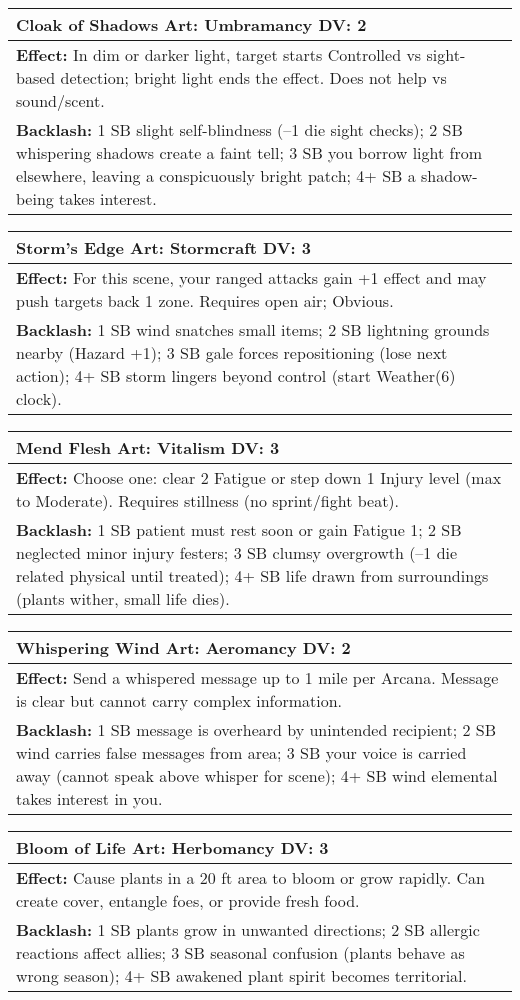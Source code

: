 \documentclass[11pt]{report}
\newenvironment{spellentry}[3]{%
  \begin{center}
    \begin{tabular}{|p{5.5in}|}
      \hline
      \textbf{#1} \hfill \textbf{Art:} #2 \hfill \textbf{DV:} #3 \\
      \hline
}{%
      \hline
    \end{tabular}
  \end{center}
}
\begin{document}
\begin{spellentry}{Cloak of Shadows}{Umbramancy}{2}
\textbf{Effect:} In dim or darker light, target starts Controlled vs sight-based detection; bright light ends the effect. Does not help vs sound/scent.\\
\textbf{Backlash:} 1 SB slight self-blindness (–1 die sight checks); 2 SB whispering shadows create a faint tell; 3 SB you borrow light from elsewhere, leaving a conspicuously bright patch; 4+ SB a shadow-being takes interest.
\end{spellentry}

\begin{spellentry}{Storm's Edge}{Stormcraft}{3}
\textbf{Effect:} For this scene, your ranged attacks gain +1 effect and may push targets back 1 zone. Requires open air; Obvious.\\
\textbf{Backlash:} 1 SB wind snatches small items; 2 SB lightning grounds nearby (Hazard +1); 3 SB gale forces repositioning (lose next action); 4+ SB storm lingers beyond control (start Weather(6) clock).
\end{spellentry}

\begin{spellentry}{Mend Flesh}{Vitalism}{3}
\textbf{Effect:} Choose one: clear 2 Fatigue or step down 1 Injury level (max to Moderate). Requires stillness (no sprint/fight beat).\\
\textbf{Backlash:} 1 SB patient must rest soon or gain Fatigue 1; 2 SB neglected minor injury festers; 3 SB clumsy overgrowth (–1 die related physical until treated); 4+ SB life drawn from surroundings (plants wither, small life dies).
\end{spellentry}

\begin{spellentry}{Whispering Wind}{Aeromancy}{2}
\textbf{Effect:} Send a whispered message up to 1 mile per Arcana. Message is clear but cannot carry complex information.\\
\textbf{Backlash:} 1 SB message is overheard by unintended recipient; 2 SB wind carries false messages from area; 3 SB your voice is carried away (cannot speak above whisper for scene); 4+ SB wind elemental takes interest in you.
\end{spellentry}

\begin{spellentry}{Bloom of Life}{Herbomancy}{3}
\textbf{Effect:} Cause plants in a 20 ft area to bloom or grow rapidly. Can create cover, entangle foes, or provide fresh food.\\
\textbf{Backlash:} 1 SB plants grow in unwanted directions; 2 SB allergic reactions affect allies; 3 SB seasonal confusion (plants behave as wrong season); 4+ SB awakened plant spirit becomes territorial.
\end{spellentry}
\end{document}
